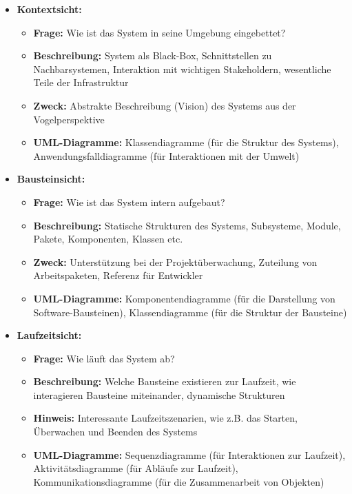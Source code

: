 \documentclass[11pt, a4paper]{article}
\begin{document}
\begin{itemize}
    \item \textbf{Kontextsicht:}
    \begin{itemize}
        \item \textbf{Frage:} Wie ist das System in seine Umgebung eingebettet?
        \item \textbf{Beschreibung:} System als Black-Box, Schnittstellen zu Nachbarsystemen, Interaktion mit wichtigen Stakeholdern, wesentliche Teile der Infrastruktur
        \item \textbf{Zweck:} Abstrakte Beschreibung (Vision) des Systems aus der Vogelperspektive
        \item \textbf{UML-Diagramme:} Klassendiagramme (für die Struktur des Systems), Anwendungsfalldiagramme (für Interaktionen mit der Umwelt)
    \end{itemize}
    \item \textbf{Bausteinsicht:}
    \begin{itemize}
        \item \textbf{Frage:} Wie ist das System intern aufgebaut?
        \item \textbf{Beschreibung:} Statische Strukturen des Systems, Subsysteme, Module, Pakete, Komponenten, Klassen etc.
        \item \textbf{Zweck:} Unterstützung bei der Projektüberwachung, Zuteilung von Arbeitspaketen, Referenz für Entwickler
        \item \textbf{UML-Diagramme:} Komponentendiagramme (für die Darstellung von Software-Bausteinen), Klassendiagramme (für die Struktur der Bausteine)
    \end{itemize}
    \item \textbf{Laufzeitsicht:}
    \begin{itemize}
        \item \textbf{Frage:} Wie läuft das System ab?
        \item \textbf{Beschreibung:} Welche Bausteine existieren zur Laufzeit, wie interagieren Bausteine miteinander, dynamische Strukturen
        \item \textbf{Hinweis:} Interessante Laufzeitszenarien, wie z.B. das Starten, Überwachen und Beenden des Systems
        \item \textbf{UML-Diagramme:} Sequenzdiagramme (für Interaktionen zur Laufzeit), Aktivitätsdiagramme (für Abläufe zur Laufzeit), Kommunikationsdiagramme (für die Zusammenarbeit von Objekten)
    \end{itemize}


\end{itemize}
\end{document}
